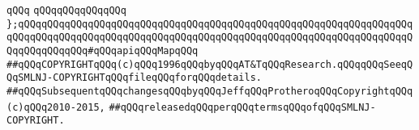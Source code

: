 \verb|qQQq|\newline
\verb|qQQqqQQqqQQqqQQq|\newline
\newline
\verb|};qQQqqQQqqQQqqQQqqQQqqQQqqQQqqQQqqQQqqQQqqQQqqQQqqQQqqQQqqQQqqQQqqQQqqQQqqQQqqQQqqQQqqQQqqQQqqQQqqQQqqQQqqQQqqQQqqQQqqQQqqQQqqQQqqQQqqQQqqQQqqQQqqQQqqQQq#qQQqapiqQQqMapqQQq|\newline
\newline
\newline
\verb|##qQQqCOPYRIGHTqQQq(c)qQQq1996qQQqbyqQQqAT&TqQQqResearch.qQQqqQQqSeeqQQqSMLNJ-COPYRIGHTqQQqfileqQQqforqQQqdetails.|\newline
\verb|##qQQqSubsequentqQQqchangesqQQqbyqQQqJeffqQQqProtheroqQQqCopyrightqQQq(c)qQQq2010-2015,|\newline
\verb|##qQQqreleasedqQQqperqQQqtermsqQQqofqQQqSMLNJ-COPYRIGHT.|\newline

